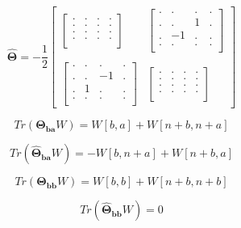 \documentclass{article}
\begin{document}
\[
    \mathbf{\hat{\Theta}} = 
    -\frac{1}{2}
    \begin{bmatrix}
        \begin{bmatrix}
            . & . & . & . \\
            . & . & . & . \\
            . & . & . & . \\
            . & . & . & . \\
        \end{bmatrix} &
        \begin{bmatrix}
            . & . & . & . \\
            . & . & 1 & . \\
            . & -1 & . & . \\
            . & . & . & . \\
        \end{bmatrix} \\ \\
        \begin{bmatrix}
            . & . & . & . \\
            . & . & -1 & . \\
            . & 1 & . & . \\
            . & . & . & . \\
        \end{bmatrix} &
        \begin{bmatrix}
            . & . & . & . \\
            . & . & . & . \\
            . & . & . & . \\
            . & . & . & . \\
        \end{bmatrix}
    \end{bmatrix}
\]

\[
    Tr(\mathbf{\Theta_{ba}}W) = W[b, a] + W[n + b, n + a]
\]

\[
    Tr(\mathbf{\hat{\Theta}_{ba}}W) = - W[b, n + a] + W[n + b, a]
\]

\[
    Tr(\mathbf{\Theta_{bb}}W) = W[b, b] + W[n + b, n + b]
\]

\[
    Tr(\mathbf{\hat{\Theta}_{bb}}W) = 0
\]
\end{document}
